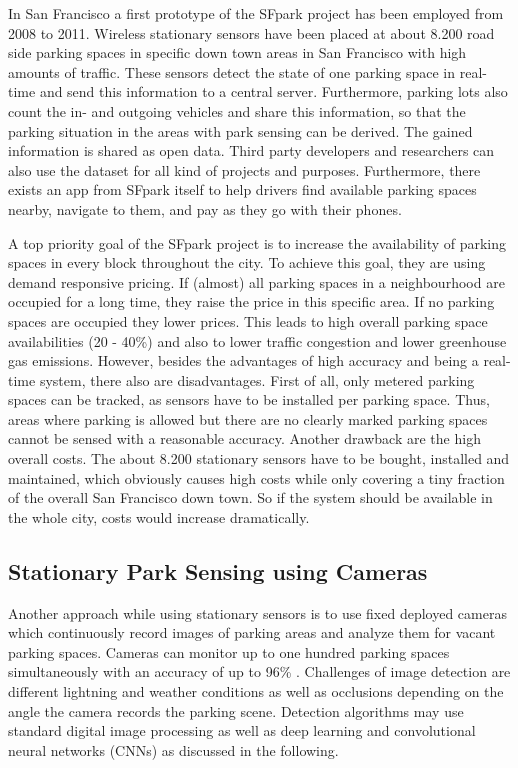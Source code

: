 In San Francisco a first prototype of the SFpark project \cite{SFPark} has been employed from 2008 to 2011. Wireless stationary sensors have been placed at about 8.200 road side parking spaces in specific down town areas in San Francisco with high amounts of traffic. These sensors detect the state of one parking space in real-time and send this information to a central server. Furthermore, parking lots also count the in- and outgoing vehicles and share this information, so that the parking situation in the areas with park sensing can be derived. The gained information is shared as open data. Third party developers and researchers can also use the dataset for all kind of projects and purposes. Furthermore, there exists an app from SFpark itself to help drivers find available parking spaces nearby, navigate to them, and pay as they go with their phones.

A top priority goal of the SFpark project is to increase the availability of parking spaces in every block throughout the city. To achieve this goal, they are using demand responsive pricing. If (almost) all parking spaces in a neighbourhood are occupied for a long time, they raise the price in this specific area. If no parking spaces are occupied they lower prices. This leads to high overall parking space availabilities (20 - 40\%) and also to lower traffic congestion and lower greenhouse gas emissions. However, besides the advantages of high accuracy and being a real-time system, there also are disadvantages. First of all, only metered parking spaces can be tracked, as sensors have to be installed per parking space. Thus, areas where parking is allowed but there are no clearly marked parking spaces cannot be sensed with a reasonable accuracy. Another drawback are the high overall costs. The about 8.200 stationary sensors have to be bought, installed and maintained, which obviously causes high costs while only covering a tiny fraction of the overall San Francisco down town. So if the system should be available in the whole city, costs would increase dramatically.





\subsection{Stationary Park Sensing using Cameras}
\label{sec:stationary_park_sensing_cameras}

Another approach while using stationary sensors is to use fixed deployed cameras which continuously record images of parking areas and analyze them for vacant parking spaces. Cameras can monitor up to one hundred parking spaces simultaneously with an accuracy of up to 96\% \cite{DiMauro2016}. Challenges of image detection are different lightning and weather conditions as well as occlusions depending on the angle the camera records the parking scene. Detection algorithms may use standard digital image processing as well as deep learning and convolutional neural networks (CNNs) as discussed in the following.


